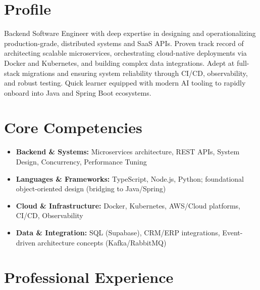 \documentclass[11pt,a4paper,sans]{moderncv}
\begin{document}
\makecvtitle

\section{Profile}
Backend Software Engineer with deep expertise in designing and operationalizing production-grade, distributed systems and SaaS APIs. Proven track record of architecting scalable microservices, orchestrating cloud-native deployments via Docker and Kubernetes, and building complex data integrations. Adept at full-stack migrations and ensuring system reliability through CI/CD, observability, and robust testing. Quick learner equipped with modern AI tooling to rapidly onboard into Java and Spring Boot ecosystems.

\section{Core Competencies}
\begin{itemize}
\item \textbf{Backend \& Systems:} Microservices architecture, REST APIs, System Design, Concurrency, Performance Tuning
\item \textbf{Languages \& Frameworks:} TypeScript, Node.js, Python; foundational object-oriented design (bridging to Java/Spring)
\item \textbf{Cloud \& Infrastructure:} Docker, Kubernetes, AWS/Cloud platforms, CI/CD, Observability
\item \textbf{Data \& Integration:} SQL (Supabase), CRM/ERP integrations, Event-driven architecture concepts (Kafka/RabbitMQ)
\end{itemize}

\section{Professional Experience}

\end{document}
